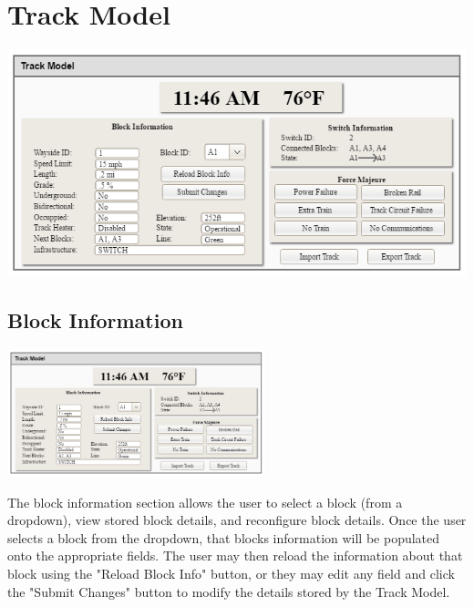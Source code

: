 \documentclass{scrreprt}
\begin{document}

\chapter{Track Model}

\includegraphics[width=\textwidth]{track-model}

\section{Block Information}

\begin{center}
    \includegraphics[trim={.5cm .5cm 11cm 3.6cm},clip,width=7.5cm]{track-model}
\end{center}

The block information section allows the user to select a block (from a dropdown), view
stored block details, and reconfigure block details. Once the user selects a block from the
dropdown, that blocks information will be populated onto the appropriate fields. The user may
then reload the information about that block using the "Reload Block Info" button, or they
may edit any field and click the "Submit Changes" button to modify the details stored by
the Track Model.
\end{document}
